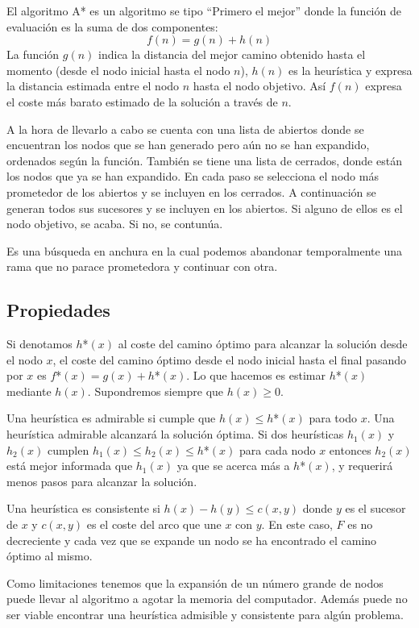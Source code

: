 \documentclass[12pt]{article}
\begin{document}
El algoritmo A* es un algoritmo se tipo ``Primero el mejor'' donde la función de evaluación es la suma de dos componentes:$$f(n)=g(n)+h(n)$$ La función $g(n)$ indica la distancia del mejor camino obtenido hasta el momento (desde el nodo inicial hasta el nodo $n$), $h(n)$ es la heurística y expresa la distancia estimada entre el nodo $n$ hasta el nodo objetivo. Así $f(n)$ expresa el coste más barato estimado de la solución a través de $n$.

A la hora de llevarlo a cabo se cuenta con una lista de abiertos donde se encuentran los nodos que se han generado pero aún no se han expandido, ordenados según la función. También se tiene una lista de cerrados, donde están los nodos que ya se han expandido. En cada paso se selecciona el nodo más prometedor de los abiertos y se incluyen en los cerrados. A continuación se generan todos sus sucesores y se incluyen en los abiertos. Si alguno de ellos es el nodo objetivo, se acaba. Si no, se contunúa.

Es una búsqueda en anchura en la cual podemos abandonar temporalmente una rama que no parace prometedora y continuar con otra.

\subsection{Propiedades}

Si denotamos $h$*$(x)$ al coste del camino óptimo para alcanzar la solución desde el nodo $x$, el coste del camino óptimo desde el nodo inicial hasta el final pasando por $x$ es $f$*$(x)=g(x)+h$*$(x)$. Lo que hacemos es estimar $h$*$(x)$ mediante $h(x)$. Supondremos siempre que $h(x)\geq 0$.

Una heurística es admirable si cumple que $h(x) \leq h$*$(x)$ para todo $x$. Una heurística admirable alcanzará la solución óptima. Si dos heurísticas $h_1(x)$ y $h_2(x)$ cumplen $h_1(x) \leq h_2(x) \leq h$*$(x)$ para cada nodo $x$ entonces $h_2(x)$ está mejor informada que $h_1(x)$ ya que se acerca más a $h$*$(x)$, y requerirá menos pasos para alcanzar la solución.

Una heurística es consistente si $h(x) - h(y) \leq c(x,y)$ donde $y$ es el sucesor de $x$ y $c(x,y)$ es el coste del arco que une $x$ con $y$. En este caso, $F$ es no decreciente y cada vez que se expande un nodo se ha encontrado el camino óptimo al mismo.

Como limitaciones tenemos que la expansión de un número grande de nodos puede llevar al algoritmo a agotar la memoria del computador. Además puede no ser viable encontrar una heurística admisible y consistente para algún problema.
\end{document}
